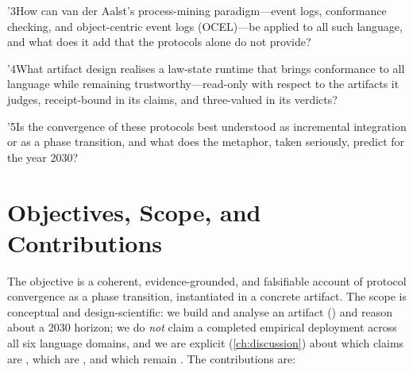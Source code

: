 \rq{3}{How can van der Aalst's process-mining paradigm---event logs, conformance
checking, and object-centric event logs (OCEL)---be applied to all such language,
and what does it add that the protocols alone do not provide?}

\rq{4}{What artifact design realises a law-state runtime that brings conformance
to all language while remaining trustworthy---read-only with respect to the
artifacts it judges, receipt-bound in its claims, and three-valued in its
verdicts?}

\rq{5}{Is the convergence of these protocols best understood as incremental
integration or as a phase transition, and what does the metaphor, taken
seriously, predict for the year 2030?}

\section{Objectives, Scope, and Contributions}
\label{sec:contributions}

The objective is a coherent, evidence-grounded, and falsifiable account of
protocol convergence as a phase transition, instantiated in a concrete artifact.
The scope is conceptual and design-scientific: we build and analyse an artifact
(\lspmax) and reason about a 2030 horizon; we do \emph{not} claim a completed
empirical deployment across all six language domains, and we are explicit
(\cref{ch:discussion}) about which claims are \admitted, which are \candidate,
and which remain \openstat. The contributions are:

